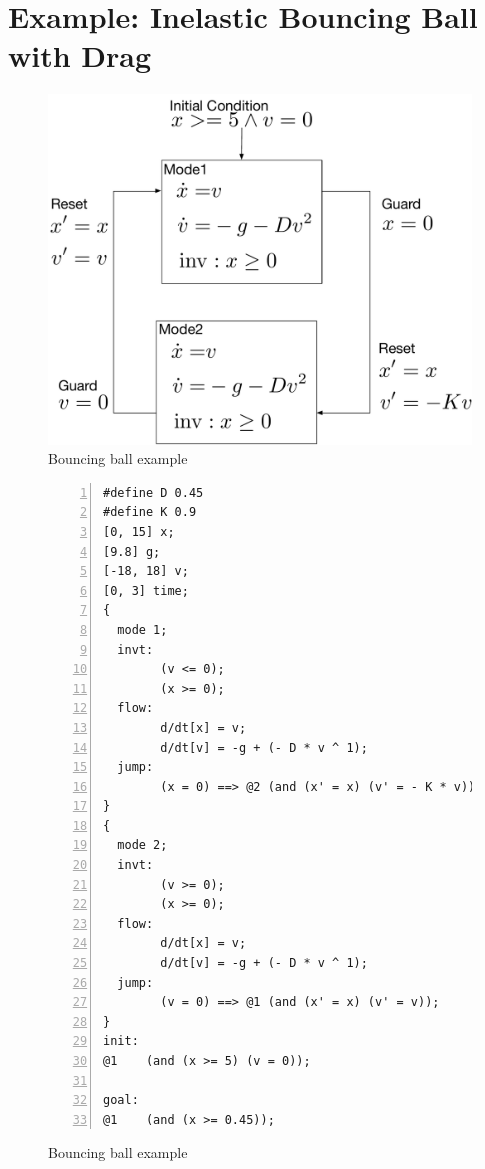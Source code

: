\section{Example: Inelastic Bouncing Ball with Drag}
\begin{figure}
  \centering
  \includegraphics[width=0.5 \textwidth]{images/bouncing_ball.pdf}
  \caption{Bouncing ball example}
  \label{fig:bouncing-ball}
\end{figure}


\begin{figure}
  \centering
  \begin{Verbatim}[fontfamily=courier, frame=single, framesep=1mm,
  numbers=left, fontsize=\scriptsize]
#define D 0.45
#define K 0.9
[0, 15] x;
[9.8] g;
[-18, 18] v;
[0, 3] time;
{
  mode 1;
  invt:
        (v <= 0);
        (x >= 0);
  flow:
        d/dt[x] = v;
        d/dt[v] = -g + (- D * v ^ 1);
  jump:
        (x = 0) ==> @2 (and (x' = x) (v' = - K * v));
}
{
  mode 2;
  invt:
        (v >= 0);
        (x >= 0);
  flow:
        d/dt[x] = v;
        d/dt[v] = -g + (- D * v ^ 1);
  jump:
        (v = 0) ==> @1 (and (x' = x) (v' = v));
}
init:
@1    (and (x >= 5) (v = 0));

goal:
@1    (and (x >= 0.45));
\end{Verbatim}
  \caption{Bouncing ball example}
  \label{fig:bouncing-ball}
\end{figure}

